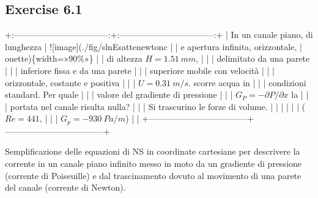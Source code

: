 \documentclass[letterpaper,10pt,italian]{jupyterBook}
\begin{document}
\subsection{Exercise 6.1}
\label{\detokenize{polimi/fluidmechanics-ita/template/capitoli/06_slnEsatte/0604in:exercise-6-1}}\label{\detokenize{polimi/fluidmechanics-ita/template/capitoli/06_slnEsatte/0604in:fluid-mechanics-exact-solutions-ex01}}\label{\detokenize{polimi/fluidmechanics-ita/template/capitoli/06_slnEsatte/0604in::doc}}
\sphinxAtStartPar
+:———————————:+:———————————:+
| In un canale piano, di lunghezza  | !{[}image{]}(./fig/slnEsatte\sphinxhyphen{}newton\sphinxhyphen{}c |
| e apertura infinita, orizzontale, | ouette)\{width=»90\%»\}              |
| di altezza \(H=1.51\ mm\),          |                                   |
| delimitato da una parete          |                                   |
| inferiore fissa e da una parete   |                                   |
| superiore mobile con velocità     |                                   |
| orizzontale, costante e positiva  |                                   |
| \(U=0.31\ m/s\). scorre acqua in    |                                   |
| condizioni standard. Per quale    |                                   |
| valore del gradiente di pressione |                                   |
| \(G_P = -\partial P/\partial x\) la |                                   |
| portata nel canale risulta nulla? |                                   |
| Si trascurino le forze di volume. |                                   |
|                                   |                                   |
| (\(Re = 441\),                      |                                   |
| \(G_p = - 930\  Pa/m\))             |                                   |
+———————————–+———————————–+

\sphinxAtStartPar
Semplificazione delle equazioni di NS in coordinate cartesiane per
descrivere la corrente in un canale piano infinito messo in moto da un
gradiente di pressione (corrente di Poiseuille) e dal trascinamento
dovuto al movimento di una parete del canale (corrente di Newton).
\end{document}
